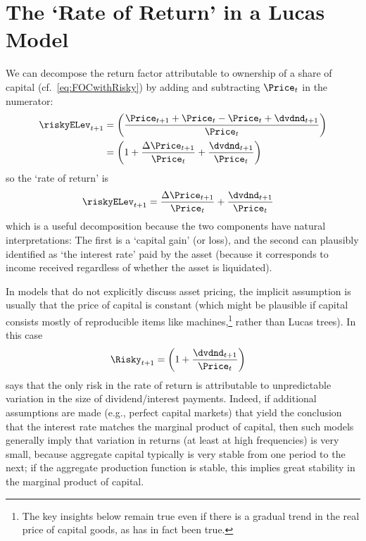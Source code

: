 \documentclass{\handout}
\begin{document}
\section{The `Rate of Return' in a Lucas Model}
We can decompose the return factor attributable to ownership of a share of capital (cf.\ \eqref{eq:FOCwithRisky}) by adding and subtracting $\Price_{t}$ in the numerator:
\begin{equation}\begin{gathered}\begin{aligned}
  \riskyELev_{t+1} & =  \left(\frac{{\Price}_{t+1}+{\Price}_{t}-{\Price}_{t}+\dvdnd_{t+1}}{\Price_{t}}\right) \notag
\\        & =  \left(1+\frac{\Delta {\Price}_{t+1}}{\Price_{t}}+\frac{\dvdnd_{t+1}}{\Price_{t}}\right) \label{eq:RiskyDecompose}
\end{aligned}\end{gathered}\end{equation}
so the `rate of return' is 
\begin{equation}\begin{gathered}\begin{aligned}
 \riskyELev_{t+1}    & =  \frac{\Delta {\Price}_{t+1}}{\Price_{t}}+\frac{\dvdnd_{t+1}}{\Price_{t}} \label{eq:riskyDecompose}
\end{aligned}\end{gathered}\end{equation}
which is a useful decomposition because the two components 
have natural interpretations: The first is a `capital gain' (or loss),
and the second can plausibly identified as `the interest rate' paid
by the asset (because it corresponds to income received regardless of whether the asset
is liquidated).

In models that do not explicitly discuss asset pricing, the
implicit assumption is usually that the price of capital is constant
(which might be plausible if capital consists mostly of reproducible items
like machines,\footnote{The key insights below remain true even if there is a gradual trend in the real price of capital goods, as has in fact been true.} rather than Lucas trees).  In this case
\begin{equation*}\begin{gathered}\begin{aligned}
  \Risky_{t+1} & =  \left(1+\frac{\dvdnd_{t+1}}{\Price_{t}}\right)
\end{aligned}\end{gathered}\end{equation*}
says that the only risk in the rate of return is attributable to unpredictable variation in the size of 
dividend/interest payments.  Indeed, if additional assumptions are made (e.g., perfect capital markets) that yield the conclusion that the interest rate matches the marginal product of capital, then such models generally imply that variation in returns (at least at high frequencies) is very small, because aggregate capital typically is very stable from one period to the next; if the aggregate production function is stable, this implies great stability in the marginal product of capital.
\end{document}
